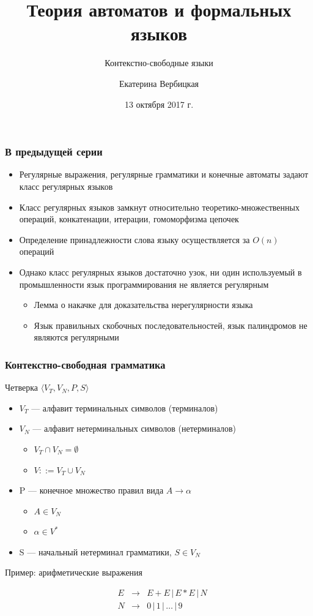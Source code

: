 \documentclass{beamer}
\title[]{Теория автоматов и формальных языков}
\subtitle[]{Контекстно-свободные языки}
\institute[]{
Санкт-Петербургский государственный электротехнический университет <<ЛЭТИ>>\\
}
\author[]{Екатерина Вербицкая}
\date{13 октября 2017 г.}
\begin{document}
{
  \begin{frame}
    \titlepage
  \end{frame}
}


\begin{frame}[fragile]
  \transwipe[direction=90]
  \frametitle{В предыдущей серии}
  \begin{itemize}
    \item Регулярные выражения, регулярные грамматики и конечные автоматы задают класс регулярных языков
    \item Класс регулярных языков замкнут относительно теоретико-множественных операций, конкатенации, итерации, гомоморфизма цепочек
    \item Определение принадлежности слова языку осуществляется за $O(n)$ операций
    \item Однако класс регулярных языков достаточно узок, ни один используемый в промышленности язык программирования не является регулярным
    \begin{itemize}
      \item Лемма о накачке для доказательства нерегулярности языка
      \item Язык правильных скобочных последовательностей, язык палиндромов не являются регулярными
    \end{itemize}
  \end{itemize}
\end{frame}

\begin{frame}[fragile]
  \transwipe[direction=90]
  \frametitle{Контекстно-свободная грамматика}
  Четверка $\langle V_T, V_N, P, S \rangle$

   \begin{itemize}
     \item $V_T$ --- алфавит терминальных символов (терминалов) 
     \item $V_N$ --- алфавит нетерминальных символов (нетерминалов)
     \begin{itemize} 
        \item $V_T \cap V_N = \emptyset$ 
        \item $V ::= V_T \cup V_N$
     \end{itemize}
     \item P --- конечное множество правил вида $A \rightarrow \alpha$
     \begin{itemize}
       \item $A \in V_N $
       \item $\alpha \in V^*$
     \end{itemize}  
     \item S --- начальный нетерминал грамматики, $S  \in V_N$
  \end{itemize}

Пример: арифметические выражения

  $$
  \begin{array}{crcl}
  &E& \rightarrow & E + E \, | \, E * E \, | \, N \\
  &N& \rightarrow & 0 \, | \, 1  \, | \, \dots \, | \, 9
  \end{array}
  $$
\end{frame}
\end{document}
